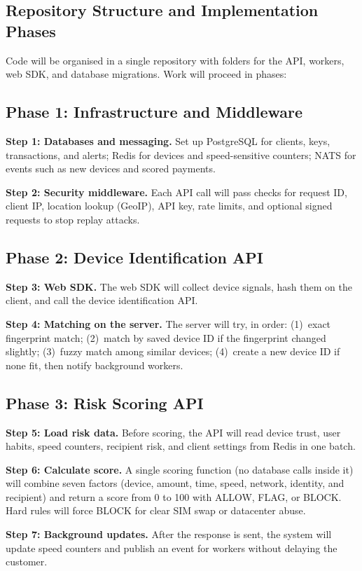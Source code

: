 \subsection{Repository Structure and Implementation Phases}
Code will be organised in a single repository with folders for the API, workers, web SDK,
and database migrations. Work will proceed in phases:

\subsection{Phase 1: Infrastructure and Middleware}
\textbf{Step 1: Databases and messaging.} Set up PostgreSQL for clients, keys, transactions,
and alerts; Redis for devices and speed-sensitive counters; NATS for events such as new
devices and scored payments.

\textbf{Step 2: Security middleware.} Each API call will pass checks for request ID, client IP,
location lookup (GeoIP), API key, rate limits, and optional signed requests to stop replay
attacks.

\subsection{Phase 2: Device Identification API}
\textbf{Step 3: Web SDK.} The web SDK will collect device signals, hash them on the client,
and call the device identification API.

\textbf{Step 4: Matching on the server.} The server will try, in order: (1)~exact fingerprint
match; (2)~match by saved device ID if the fingerprint changed slightly; (3)~fuzzy match
among similar devices; (4)~create a new device ID if none fit, then notify background workers.

\subsection{Phase 3: Risk Scoring API}
\textbf{Step 5: Load risk data.} Before scoring, the API will read device trust, user habits,
speed counters, recipient risk, and client settings from Redis in one batch.

\textbf{Step 6: Calculate score.} A single scoring function (no database calls inside it)
will combine seven factors (device, amount, time, speed, network, identity, and
recipient) and return a score from 0 to 100 with ALLOW, FLAG, or BLOCK. Hard rules will
force BLOCK for clear SIM swap or datacenter abuse.

\textbf{Step 7: Background updates.} After the response is sent, the system will update speed
counters and publish an event for workers without delaying the customer.


